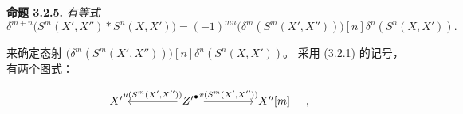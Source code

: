 \medskip\noindent\textbf{命题 3.2.5.}\quad
\textit{有等式}
\[
\delta^{m+n}\bigl(S^m(X',X'')*S^n(X,X')\bigr)=
(-1)^{mn}\bigl(\delta^m(S^m(X',X''))\bigr)[n]
\delta^n(S^n(X,X')).
\]

来确定态射
$\bigl(\delta^m(S^m(X',X''))\bigr)[n]\delta^n(S^n(X,X'))$。
采用 (3.2.1) 的记号，有两个图式：

\[
\begin{tikzcd}[column sep=4.5em]
X' & {Z'}^\bullet
  \arrow[l,"{u(S^m(X',X''))}"']
  \arrow[r,"{v(S^m(X',X''))}"]
& X''[m]
\end{tikzcd}
\quad,
\]
\endgroup
